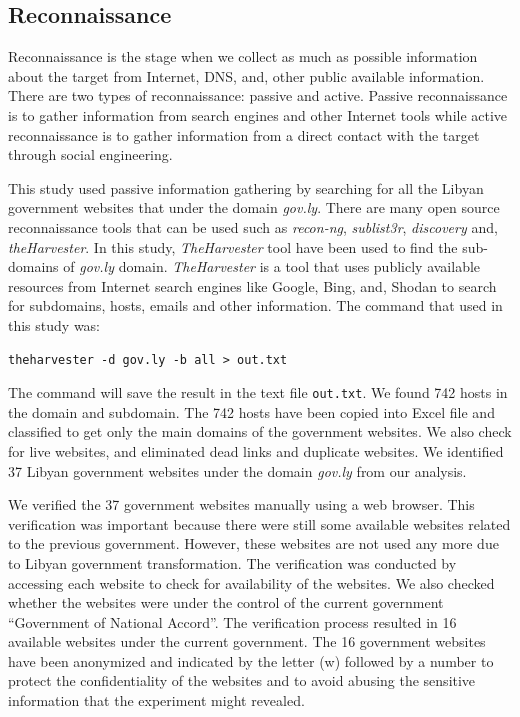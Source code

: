 \documentclass[conference]{IEEEtran}
\begin{document}
\subsection{Reconnaissance}

Reconnaissance is the stage when we collect as much as possible information
about the target from Internet, DNS, and, other public available information.
There are two types of
reconnaissance: passive and active. Passive reconnaissance is
to gather information from search engines and other Internet tools while active
reconnaissance is to gather information from a direct contact with the
target through social engineering.

This study used passive
information gathering by searching for all the
Libyan government websites that under the domain
\emph{gov.ly}. There are many open source reconnaissance tools that can
be used such as \emph{recon-ng}, \emph{sublist3r}, \emph{discovery} and, \emph{theHarvester}\cite{buchanan2017kali}.
In this study,
\emph{TheHarvester} tool have been used to find the sub-
domains of \emph{gov.ly} domain. \emph{TheHarvester} is a tool
that uses publicly available resources from Internet search engines like
Google, Bing, and, Shodan to search for subdomains, hosts, emails and other information. The
command that used in this study was:

\begin{verbatim}
theharvester -d gov.ly -b all > out.txt
\end{verbatim}

The command will save the result in the text file
\verb|out.txt|. We found 742 hosts in the domain and subdomain. The 742 hosts have been
copied into Excel file and
classified to get only the main domains of the
government websites. We also check for live websites, and eliminated dead links
and duplicate websites. We identified 37 Libyan government websites under
the domain \emph{gov.ly} from our analysis.

We verified the 37
government websites manually using
a web browser. This verification was important because there were still
some available websites related to the previous
government. However, these websites are not used
any more due to Libyan government transformation. 
The verification was conducted by accessing each website to check for availability of the
websites. We also checked whether the websites were
under the control of the current government
``Government of National Accord''. The
verification process resulted in 16
available websites under the current
government. The 16 government websites have been
anonymized and indicated by the letter (w) followed
by a number to protect the confidentiality of the
websites and to avoid abusing the sensitive
information that the experiment might revealed.
\end{document}
